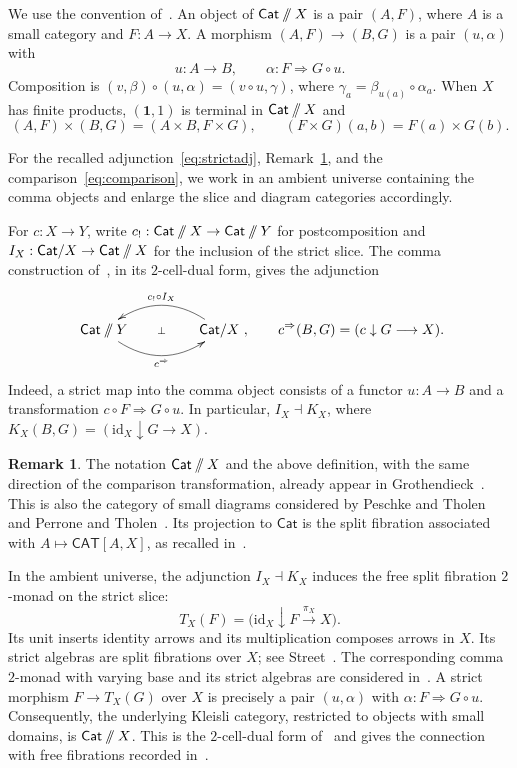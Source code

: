 \documentclass[11pt,a4paper]{amsart}
\makeatletter
\theoremstyle{definition}
\newtheorem{remark}[theorem]{Remark}
\numberwithin{equation}{section}
\newcommand{\Cat}{\mathsf{Cat}}
\newcommand{\CAT}{\mathsf{CAT}}
\newcommand{\one}{\mathbf{1}}
\newcommand{\id}{\mathrm{id}}
\newcommand{\sslash}{\mathbin{/\mkern-6mu/}}
\newcommand{\DX}{\Cat\sslash X}
\newcommand{\DY}{\Cat\sslash Y}
\newcommand{\Adj}[4]{\xymatrix@C=4.5em{#1\ar@/_1.5pc/[r]_{#4}& #2\ar@/_1.5pc/[l]_{#3}\ar@{}[l]|{\bot}}}
\makeatother
\begin{document}
We use the convention of~\cite{CNP}. An object of $\DX$ is a pair $(A,F)$, where $A$ is a small category and $F:A\to X$. A morphism $(A,F)\to(B,G)$ is a pair $(u,\alpha)$ with
\[
 u:A\longrightarrow B,
 \qquad \alpha:F\Longrightarrow G\circ u.
\]
Composition is $(v,\beta)\circ(u,\alpha)=(v\circ u,\gamma)$, where $\gamma_a=\beta_{u(a)}\circ\alpha_a$. When $X$ has finite products, $(\one,1)$ is terminal in $\DX$ and
\begin{equation}\label{eq:diagproducts}
 (A,F)\times(B,G)=(A\times B,F\times G),
 \qquad (F\times G)(a,b)=F(a)\times G(b).
\end{equation}

For the recalled adjunction~\eqref{eq:strictadj}, Remark~\ref{rem:diagrams}, and the comparison~\eqref{eq:comparison}, we work in an ambient universe containing the comma objects and enlarge the slice and diagram categories accordingly.

For $c:X\to Y$, write $c_!:\DX\to\DY$ for postcomposition and $I_X:\Cat/X\to\DX$ for the inclusion of the strict slice. The comma construction of~\cite[Theorem~5.8]{CN2}, in its $2$-cell-dual form, gives the adjunction
\begin{equation}\label{eq:strictadj}
 \Adj{\DY}{\Cat/X}{c_!\circ I_X}{c^{\Rightarrow}},
 \qquad c^{\Rightarrow}(B,G)=(c\downarrow G\longrightarrow X).
\end{equation}
Indeed, a strict map into the comma object consists of a functor $u:A\to B$ and a transformation $c\circ F\Rightarrow G\circ u$. In particular, $I_X\dashv K_X$, where
$K_X(B,G)=(\id_X\downarrow G\to X)$.

\begin{remark}\label{rem:diagrams}
The notation $\Cat\sslash X$ and the above definition, with the same direction of the comparison transformation, already appear in Grothendieck~\cite[Section~11(b), p.~186]{SGA1}. This is also the category of small diagrams considered by Peschke and Tholen~\cite[Definition~2.1]{PeschkeTholen} and Perrone and Tholen~\cite[Definition~2.1]{PerroneTholen}. Its projection to $\Cat$ is the split fibration associated with $A\mapsto\CAT[A,X]$, as recalled in~\cite[Section~1.2]{CNP}.

In the ambient universe, the adjunction $I_X\dashv K_X$ induces the free split fibration $2$-monad on the strict slice:
\[
 T_X(F)=\bigl(\id_X\downarrow F\xrightarrow{\pi_X}X\bigr).
\]
Its unit inserts identity arrows and its multiplication composes arrows in $X$. Its strict algebras are split fibrations over $X$; see Street~\cite[Section~2]{Street74}. The corresponding comma $2$-monad with varying base and its strict algebras are considered in~\cite{NT}. A strict morphism $F\to T_X(G)$ over $X$ is precisely a pair $(u,\alpha)$ with $\alpha:F\Rightarrow G\circ u$. Consequently, the underlying Kleisli category, restricted to objects with small domains, is $\DX$. This is the $2$-cell-dual form of~\cite[Theorem~5.11]{CN2} and gives the connection with free fibrations recorded in~\cite[Section~4.3]{CNP}.
\end{remark}
\end{document}
